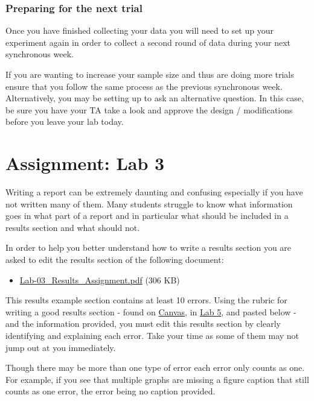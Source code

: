 \documentclass[
]{book}
\providecommand{\tightlist}{%
  \setlength{\itemsep}{0pt}\setlength{\parskip}{0pt}}
\begin{document}
\hypertarget{preparing-for-the-next-trial}{%
\subsection*{Preparing for the next trial}\label{preparing-for-the-next-trial}}

Once you have finished collecting your data you will need to set up your experiment again in order to collect a second round of data during your next synchronous week.

If you are wanting to increase your sample size and thus are doing more trials ensure that you follow the same process as the previous synchronous week. Alternatively, you may be setting up to ask an alternative question. In this case, be sure you have your TA take a look and approve the design / modifications before you leave your lab today.

\hypertarget{assignment-lab-3}{%
\chapter*{Assignment: Lab 3}\label{assignment-lab-3}}

Writing a report can be extremely daunting and confusing especially if you have not written many of them. Many students struggle to know what information goes in what part of a report and in particular what should be included in a results section and what should not.

In order to help you better understand how to write a results section you are asked to edit the results section of the following document:

\begin{itemize}
\tightlist
\item
  \href{https://osf.io/download/nk5du}{Lab-03\_Results\_Assignment.pdf} (306 KB)
\end{itemize}

This results example section contains at least 10 errors. Using the rubric for writing a good results section - found on \href{https://canvas.ubc.ca}{Canvas}, in \href{05-Lab-5\#rubric.html}{Lab 5}, and pasted below - and the information provided, you must edit this results section by clearly identifying and explaining each error. Take your time as some of them may not jump out at you immediately.

Though there may be more than one type of error each error only counts as one. For example, if you see that multiple graphs are missing a figure caption that still counts as one error, the error being no caption provided.
\end{document}
